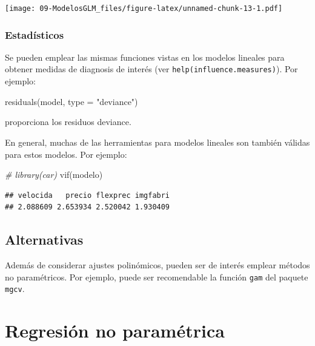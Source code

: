 \documentclass[
]{book}
\newenvironment{Shaded}{\begin{snugshade}}{\end{snugshade}}
\newcommand{\AttributeTok}[1]{\textcolor[rgb]{0.77,0.63,0.00}{#1}}
\newcommand{\CommentTok}[1]{\textcolor[rgb]{0.56,0.35,0.01}{\textit{#1}}}
\newcommand{\FunctionTok}[1]{\textcolor[rgb]{0.00,0.00,0.00}{#1}}
\newcommand{\NormalTok}[1]{#1}
\newcommand{\StringTok}[1]{\textcolor[rgb]{0.31,0.60,0.02}{#1}}
\theoremstyle{break}
\theoremstyle{nonumberplain}
\begin{document}
\texttt{[image: 09-ModelosGLM\_files/figure-latex/unnamed-chunk-13-1.pdf]}

\hypertarget{estaduxedsticos-1}{%
\subsection{Estadísticos}\label{estaduxedsticos-1}}

Se pueden emplear las mismas funciones vistas en los modelos lineales para obtener medidas de diagnosis de interés (ver \texttt{help(influence.measures)}). Por ejemplo:

\begin{Shaded}
\begin{Highlighting}[]
\FunctionTok{residuals}\NormalTok{(model, }\AttributeTok{type =} \StringTok{"deviance"}\NormalTok{) }
\end{Highlighting}
\end{Shaded}

proporciona los residuos deviance.

En general, muchas de las herramientas para modelos lineales son también válidas para estos modelos. Por ejemplo:

\begin{Shaded}
\begin{Highlighting}[]
\CommentTok{\# library(car)}
\FunctionTok{vif}\NormalTok{(modelo)}
\end{Highlighting}
\end{Shaded}

\begin{verbatim}
## velocida   precio flexprec imgfabri 
## 2.088609 2.653934 2.520042 1.930409
\end{verbatim}

\hypertarget{alternativas-1}{%
\section{Alternativas}\label{alternativas-1}}

Además de considerar ajustes polinómicos, pueden ser de interés emplear métodos no paramétricos. Por ejemplo, puede ser recomendable la función \texttt{gam} del paquete \texttt{mgcv}.

\hypertarget{regresiuxf3n-no-paramuxe9trica}{%
\chapter{Regresión no paramétrica}\label{regresiuxf3n-no-paramuxe9trica}}
\end{document}
